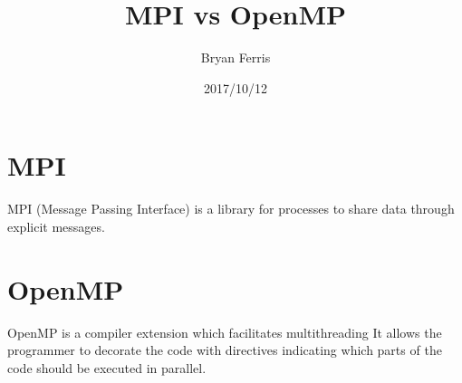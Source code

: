 \documentclass{standalone}
\title{MPI vs OpenMP}
\date{2017/10/12}
\author{Bryan Ferris}
\begin{document}
\ifstandalone
\maketitle
{}


\newpage
{}
\fi

\section{MPI}
MPI (Message Passing Interface) is a library for processes to share data through
explicit messages.

\section{OpenMP}
OpenMP is a compiler extension which facilitates multithreading It allows the
programmer to decorate the code with directives indicating which parts of the
code should be executed in parallel.
\end{document}
